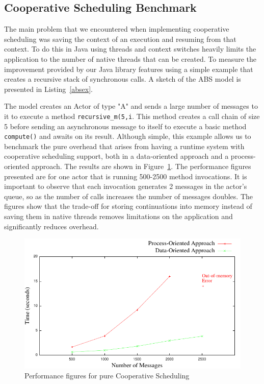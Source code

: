 \subsection{Cooperative Scheduling Benchmark}
The main problem that we encountered when implementing cooperative scheduling was saving the context of an execution and resuming from that context. To do this in Java using threads and context switches heavily limits the application to the number of native threads that can be created.  To measure the improvement provided by our Java library features using a simple example that creates a recursive stack of synchronous calls.  A sketch of the ABS model is presented in Listing~\ref{absex}.
\par The model creates an Actor of type "A" and sends a large number of messages to it to execute a method \lstinline|recursive_m(5,i|. This method creates a call chain of size 5 before sending an asynchronous message to itself to execute a basic method \lstinline|compute()| and awaits on its result. Although simple, this example allows us to benchmark the pure overhead that arises from having a runtime system with cooperative scheduling support, both in a data-oriented approach and a process-oriented approach. The results are shown in Figure~\ref{jj}. The performance figures presented are for one actor that is running 500-2500 method invocations. It is important to observe that each invocation generates 2 messages in the actor's queue, so as the number of calls increases the number of messages doubles. The figures show that the trade-off for storing continuations into memory instead of saving them in native threads removes limitations on the application and significantly reduces overhead. 

\begin{figure}
	\centering
	\includegraphics[scale=.68]{jaj8.pdf}
	\caption{Performance figures for pure Cooperative Scheduling}
	\label{jj}
\end{figure}

